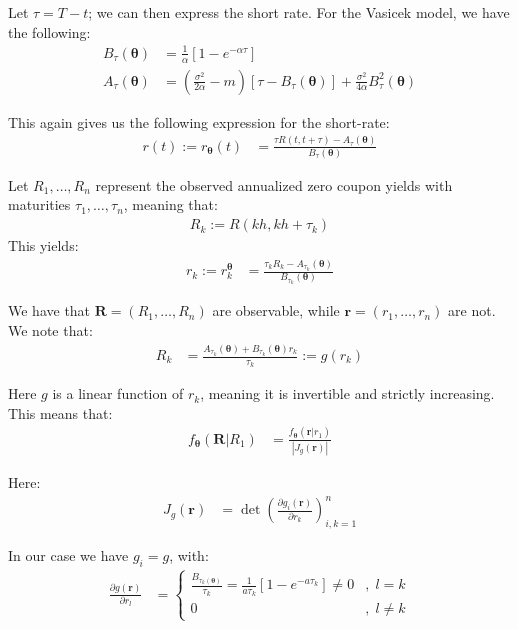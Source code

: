 Let $\tau = T-t$; we can then express the short rate. For the Vasicek model, we have the following: 
\begin{align*}
B_{\tau}(\bm{\theta}) &= \frac{1}{\alpha}[1-e^{-\alpha \tau}] \\ 
A_{\tau}(\bm{\theta}) &= 
\left(
\frac{\sigma^{2}}{2\alpha} - m
\right)[\tau - B_{\tau}(\bm{\theta})]
+ \frac{\sigma^{2}}{4\alpha}B_{\tau}^{2}(\bm{\theta})
\end{align*}

This again gives us the following expression for the short-rate: 
\begin{align*}
r(t) := r_{\bm{\theta}}(t) 
&= 
\frac{
\tau R(t,t+\tau) - A_{\tau}(\bm{\theta})
}{
B_{\tau}(\bm{\theta})
}
\end{align*}

Let $R_{1}, \dots, R_{n}$ represent the observed annualized zero coupon yields with maturities $\tau_{1}, \dots, \tau_{n}$, meaning that: 
\begin{align*}
R_{k} := R(kh, kh + \tau_{k})    
\end{align*}
This yields: 
\begin{align*}
r_{k}:= r_{k}^{\bm{\theta}}
&= 
\frac{
\tau_{k}R_{k}-A_{\tau_{k}}(\bm{\theta})
}{
B_{\tau_{k}}(\bm{\theta})
}
\end{align*}

We have that $\bm{R} = (R_{1}, \dots, R_{n})$ are observable, while $\bm{r} = (r_{1}, \dots, r_{n})$ are not. We note that: 
\begin{align*}
R_{k} &= \frac{
A_{\tau_{k}}(\bm{\theta}) + B_{\tau_{k}}(\bm{\theta})r_{k}
}{
\tau_{k}
}
:= g(r_{k})
\end{align*}

Here $g$ is a linear function of $r_{k}$, meaning it is invertible and strictly increasing. This means that: 
\begin{align*}
 f_{\bm{\theta}}(\bm{R}|R_{1}) &= \frac{
 f_{\bm{\theta}}(\bm{r}|r_{1})
 }{
 |J_{g}(\bm{r})|
 }   
\end{align*}

Here: 
\begin{align*}
J_{g}(\bm{r}) &= \det\left(
\frac{\partial g_{i}(\bm{r})}{
\partial r_{k}
}
\right)_{i,k = 1}^{n}    
\end{align*}

In our case we have $g_{i} = g$, with: 
\begin{align*}
\frac{
\partial g(\bm{r})
}{
\partial r_{l}
}
&= 
\begin{cases}
      \frac{B_{\tau_{k}(\bm{\theta})}}{\tau_{k}} = \frac{1}{a\tau_{k}}[1-e^{-a\tau_{k}}] \neq 0
      &, \; l = k\\
      0 &, \; l \neq k
    \end{cases}  
\end{align*}

